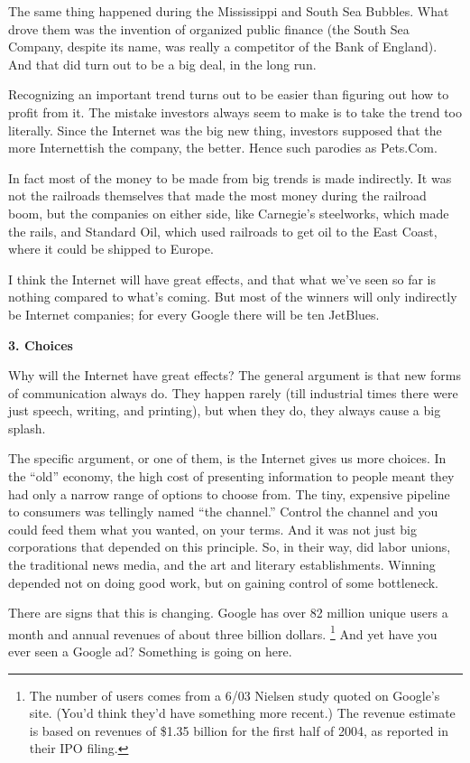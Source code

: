 The same thing happened during the Mississippi and South Sea Bubbles.
What drove them was the invention of organized public finance (the South
Sea Company, despite its name, was really a competitor of the Bank of
England). And that did turn out to be a big deal, in the long run.

Recognizing an important trend turns out to be easier than figuring out
how to profit from it. The mistake investors always seem to make is to
take the trend too literally. Since the Internet was the big new thing,
investors supposed that the more Internettish the company, the better.
Hence such parodies as Pets.Com.

In fact most of the money to be made from big trends is made indirectly.
It was not the railroads themselves that made the most money during the
railroad boom, but the companies on either side, like Carnegie's
steelworks, which made the rails, and Standard Oil, which used railroads
to get oil to the East Coast, where it could be shipped to Europe.

I think the Internet will have great effects, and that what we've seen
so far is nothing compared to what's coming. But most of the winners
will only indirectly be Internet companies; for every Google there will
be ten JetBlues.

\textbf{3. Choices}

Why will the Internet have great effects? The general argument is that
new forms of communication always do. They happen rarely (till
industrial times there were just speech, writing, and printing), but
when they do, they always cause a big splash.

The specific argument, or one of them, is the Internet gives us more
choices. In the ``old'' economy, the high cost of presenting information
to people meant they had only a narrow range of options to choose from.
The tiny, expensive pipeline to consumers was tellingly named ``the
channel.'' Control the channel and you could feed them what you wanted,
on your terms. And it was not just big corporations that depended on
this principle. So, in their way, did labor unions, the traditional news
media, and the art and literary establishments. Winning depended not on
doing good work, but on gaining control of some bottleneck.

There are signs that this is changing. Google has over 82 million unique
users a month and annual revenues of about three billion dollars.
\footnote{The number of users comes from a 6/03 Nielsen study quoted on
Google's site. (You'd think they'd have something more recent.) The
revenue estimate is based on revenues of \$1.35 billion for the first
half of 2004, as reported in their IPO filing.} And yet have you ever seen a Google ad? Something is going on
here.

